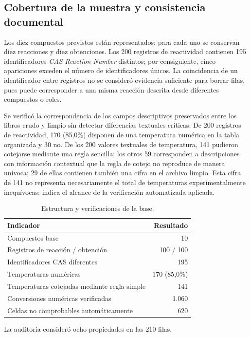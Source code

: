 \subsection{Cobertura de la muestra y consistencia documental}
Los diez compuestos previstos están representados; para cada uno se conservan diez reacciones y diez obtenciones. Los 200 registros de reactividad contienen 195 identificadores \emph{CAS Reaction Number} distintos; por consiguiente, cinco apariciones exceden el número de identificadores únicos. La coincidencia de un identificador entre registros no se consideró evidencia suficiente para borrar filas, pues puede corresponder a una misma reacción descrita desde diferentes compuestos o roles.

Se verificó la correspondencia de los campos descriptivos preservados entre los libros crudo y limpio sin detectar diferencias textuales críticas. De 200 registros de reactividad, 170 (85,0\%) disponen de una temperatura numérica en la tabla organizada y 30 no. De los 200 valores textuales de temperatura, 141 pudieron cotejarse mediante una regla sencilla; los otros 59 corresponden a descripciones con información contextual que la regla de cotejo no reproduce de manera unívoca; 29 de ellas contienen también una cifra en el archivo limpio. Esta cifra de 141 no representa necesariamente el total de temperaturas experimentalmente inequívocas: indica el alcance de la verificación automatizada aplicada.


\begin{table}[!htbp]
\centering
\caption{Estructura y verificaciones de la base.}\label{tab:auditoria}
\footnotesize
\begin{tabularx}{\columnwidth}{@{}Xr@{}}
\toprule
Indicador & Resultado \\
\midrule
Compuestos base & 10 \\
Registros de reacción / obtención & 100 / 100 \\
Identificadores CAS diferentes & 195 \\
Temperaturas numéricas & 170 (85,0\%) \\
Temperaturas cotejadas mediante regla simple & 141 \\
Conversiones numéricas verificadas & 1.060 \\
Celdas no comprobables automáticamente & 620 \\
\bottomrule
\end{tabularx}
\par\vspace{2pt}
{\scriptsize La auditoría consideró ocho propiedades en las 210 filas.}
\end{table}



